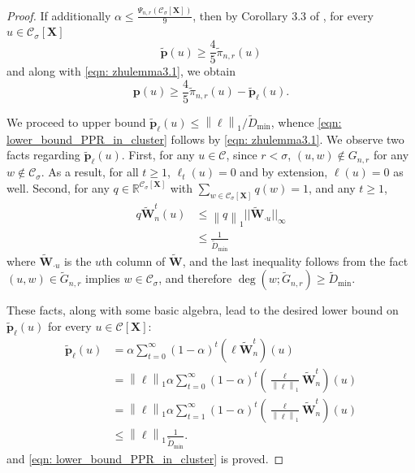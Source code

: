 \documentclass{article}
\newcommand{\Reals}{\mathbb{R}}
\newcommand{\norm}[1]{\left\lVert#1\right\rVert}
\newcommand{\1}{\mathbf{1}}
\newcommand{\pbf}{\mathbf{p}}
\newcommand{\Xbf}{\mathbf{X}}
\newcommand{\Wbf}{\mathbf{W}}
\newcommand{\Cset}{\mathcal{C}}
\newcommand{\Csig}{\Cset_{\sigma}}
\theoremstyle{aldenthm}
\begin{document}
\begin{proof}
	If additionally $\alpha \leq \frac{\Psi_{n,r}(\Csig[\Xbf])}{9}$, then by Corollary 3.3 of \citep{zhu2013}, for every $u \in \Csig[\Xbf]$
	\begin{equation*}
	\widetilde{\pbf}(u) \geq \frac{4}{5} \widetilde{\pi}_{n,r}(u)
	\end{equation*}
	and along with \eqref{eqn: zhulemma3.1}, we obtain
	\begin{equation*}
	\pbf(u) \geq \frac{4}{5} \widetilde{\pi}_{n,r}(u) - \widetilde{\pbf}_{\ell}(u).
	\end{equation*}
	
	We proceed to upper bound $\widetilde{\pbf}_{\ell}(u) \leq \norm{\ell}_1 / \widetilde{D}_{\min}$, whence \eqref{eqn: lower_bound_PPR_in_cluster} follows by \eqref{eqn: zhulemma3.1}. We observe two facts regarding $\widetilde{\pbf}_{\ell}(u)$. First, for any $u \in \Cset$, since $r < \sigma$, $(u,w) \not\in G_{n,r}$ for any $w \not\in \Csig$. As a result, for all $t \geq 1$, $\ell_t(u) = 0$ and by extension, $\ell(u) = 0$ as well. Second, for any $q \in \Reals^{\Csig[\Xbf]}$ with $\sum_{w \in \Csig[\Xbf]} q(w) = 1$, and any $t \geq 1$,
	\begin{align}
	\label{eqn: one_step_bound}
	q \widetilde{\Wbf}_n^t (u) & \leq \norm{q}_1 ||\widetilde{\Wbf}_{\cdot u}||_{\infty} \nonumber \\
	& \leq \frac{1}{\widetilde{D}_{\min}} 
	\end{align}
	where $\widetilde{\Wbf}_{\cdot u}$ is the $u$th column of $\widetilde{\Wbf}$, and the last inequality follows from the fact $(u,w) \in \widetilde{G}_{n,r}$ implies $w \in \Csig$, and therefore $\deg(w; \widetilde{G}_{n,r}) \geq \widetilde{D}_{\min}$.
	
	These facts, along with some basic algebra, lead to the desired lower bound on $\widetilde{\pbf}_{\ell}(u)$ for every $u \in \Cset[\Xbf]$:
	\begin{align*}
	\widetilde{\pbf}_{\ell}(u) & = \alpha \sum_{t = 0}^{\infty} (1 - \alpha)^t \left(\ell \widetilde{\Wbf}_n^t \right)(u)  \nonumber \\
	& = \norm{\ell}_1 \alpha \sum_{t = 0}^{\infty} (1 - \alpha)^t \left(\frac{\ell}{\norm{\ell}_1}  \widetilde{\Wbf}_n^t \right)(u)\nonumber \\
	& = \norm{\ell}_1 \alpha \sum_{t = 1}^{\infty} (1 - \alpha)^t \left(\frac{\ell}{\norm{\ell}_1}  \widetilde{\Wbf}_n^t \right)(u)\nonumber \\
	& \leq \norm{\ell}_1 \frac{1}{\widetilde{D}_{\min}}.
	\end{align*}
	and \eqref{eqn: lower_bound_PPR_in_cluster} is proved.
	

\end{proof}
\end{document}
